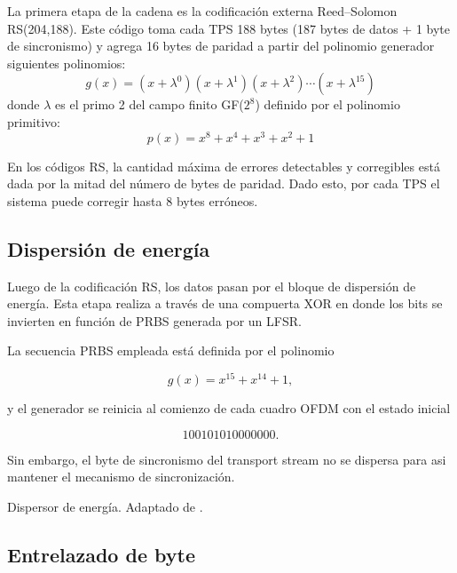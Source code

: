 La primera etapa de la cadena es la codificación externa Reed--Solomon RS(204,188). Este código toma cada TPS 188 bytes (187 bytes de datos + 1 byte de sincronismo) y agrega 16 bytes de paridad a partir del polinomio generador siguientes polinomios:
\begin{equation} g(x) = (x + \lambda^0)(x + \lambda^1)(x + \lambda^2) \cdots (x + \lambda^{15})
\end{equation}
donde $\lambda$ es el primo 2 del campo finito GF($2^8$) definido por el polinomio primitivo:
\begin{equation}
    p(x) = x^8 + x^4 + x^3 + x^2 + 1
\end{equation}


En los códigos RS, la cantidad máxima de errores detectables y corregibles está dada por la mitad del número de bytes de paridad. Dado esto, por cada TPS el sistema puede corregir hasta 8 bytes erróneos.


\subsection{Dispersión de energía}

Luego de la codificación RS, los datos pasan por el bloque de dispersión de energía. Esta etapa realiza a través de una compuerta XOR en donde los bits se invierten en función de PRBS generada por un LFSR.

La secuencia PRBS empleada está definida por el polinomio

\begin{equation}
g(x)=x^{15}+x^{14}+1,
\end{equation}

y el generador se reinicia al comienzo de cada cuadro OFDM con el estado inicial

\begin{equation}
100101010000000.
\end{equation}

Sin embargo, el byte de sincronismo del transport stream no se dispersa para asi mantener el mecanismo de sincronización.

{Dispersor de energía.}
{Adaptado de \cite{isdbt}.}
{\label{fig:prbs}}

\subsection{Entrelazado de byte}

